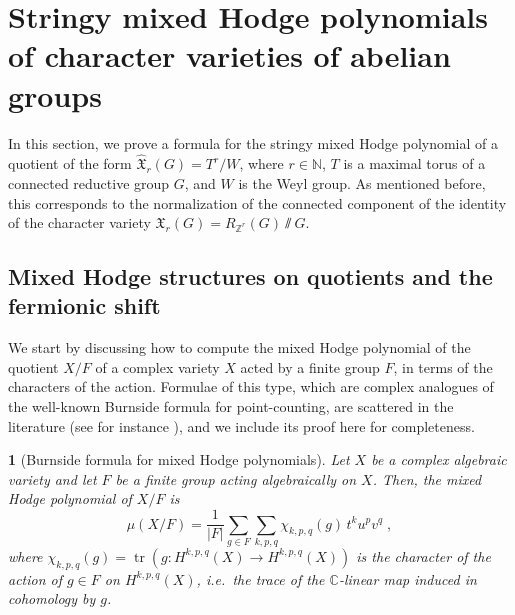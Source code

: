 \documentclass[11pt,english]{amsart}
\numberwithin{equation}{section}
\numberwithin{figure}{section}
\theoremstyle{plain}
\newtheorem{prop}[thm]{\protect\propositionname}
\theoremstyle{plain}
\theoremstyle{definition}
\theoremstyle{remark}
\newcommand{\ZZ}{\mathbb{Z}}
\newcommand{\CC}{\mathbb{C}}
\newcommand{\tr}{\operatorname{tr}}
\providecommand{\propositionname}{Proposition}
\begin{document}
\section{Stringy mixed Hodge polynomials of character varieties of abelian groups}\label{sec:stringy-mhpoly}

In this section, we prove a formula for the stringy mixed Hodge polynomial of a quotient of the form $\hat{\mathfrak{X}}_r(G) = T^r/W$, where $r\in {\mathbb N}$, $T$ is a maximal torus of a connected reductive group $G$, and $W$ is the Weyl group. 
As mentioned before, this corresponds to the normalization of the connected component of the identity of the character variety $\mathfrak{X}_{r}(G) = R_{\ZZ^r}(G)\sslash G$.


\subsection{Mixed Hodge structures on quotients and the fermionic shift}\label{sec:mhs-quotients}


We start by discussing how to compute the mixed Hodge polynomial of the quotient $X/F$ of a complex variety $X$ acted by a finite group $F$, in terms of the characters of the action. Formulae of this type, which are complex analogues of the well-known Burnside formula for point-counting, are scattered in the literature (see for instance \cite{batyrev1996strong}), and we include its proof here for completeness.


\begin{prop}[Burnside formula for mixed Hodge polynomials]\label{prop:Burnside}
Let $X$ be a complex algebraic variety and let $F$ be a finite group acting algebraically on $X$. Then, the mixed Hodge polynomial of $X/F$ is
$$
    \mu(X/F) = \frac{1}{|F|}\sum_{g \in F}\sum_{k,p,q} \chi_{k,p,q}(g) \,t^ku^pv^q\; ,
$$
where $\chi_{k,p,q}(g) =\tr(g: H^{k,p,q}(X) \to H^{k,p,q}(X))$ is the character of the action of $g \in F$ on $H^{k,p,q}(X)$, i.e.\ the trace of the $\CC$-linear map induced in cohomology by $g$.
\end{prop}
\end{document}
